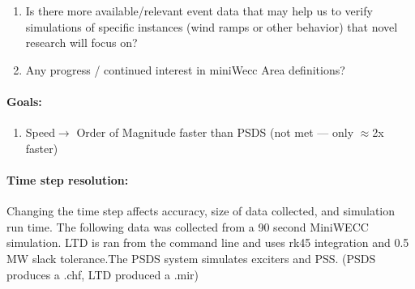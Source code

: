\documentclass[12pt]{article}
\begin{document}
\begin{multicols}{2}
\begin{enumerate}
		\item Is there more available/relevant event data that may help us to verify simulations of specific instances (wind ramps or other behavior) that novel research will focus on? %

		\item  Any progress / continued interest in miniWecc Area definitions?

		
		
	\end{enumerate}
\paragraph{Goals:}
	\begin{enumerate}
	\item Speed$\longrightarrow$ Order of Magnitude faster than PSDS (not met --- only $\approx$2x faster)
	\end{enumerate}

\vfill\null

\end{multicols}
\pagebreak
\paragraph{Time step resolution:} Changing the time step affects accuracy, size of data collected, and simulation run time. The following data was collected from a 90 second MiniWECC simulation. LTD is ran from the command line and uses rk45 integration and 0.5 MW slack tolerance.The PSDS system simulates exciters and PSS. (PSDS produces a .chf, LTD produced a .mir)
\end{document}
